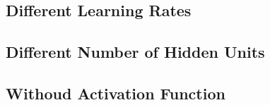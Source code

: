 \subsection{Different Learning Rates}

\subsection{Different Number of Hidden Units}

\subsection{Withoud Activation Function}